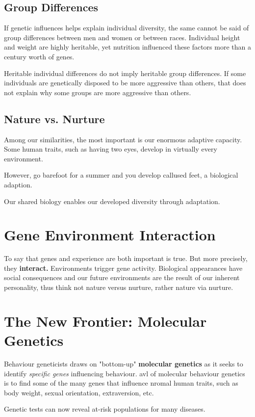 \subsection*{Group Differences}
If genetic influences helps explain individual diversity, the same cannot be said of group differences between men and women or between races. Individual height and weight are highly heritable, yet nutrition influenced these factors more than a century worth of genes.

Heritable individual differences do not imply heritable group differences. If some individuals are genetically disposed to be more aggressive than others, that does not explain why some groups are more aggressive than others. 

\subsection*{Nature vs. Nurture} 
Among our similarities, the most important is our enormous adaptive capacity. Some human traits, such as having two eyes, develop in virtually every environment.

However, go barefoot for a summer and you develop callused feet, a biological adaption. 

Our shared biology enables our developed diversity through adaptation.

\section*{Gene Environment Interaction}
To say that genes and experience are both important is true. But more precisely, they \textbf{interact.} Environments trigger gene activity. Biological appearances have social consequences and our future environments are the result of our inherent personality, thus think not nature versus nurture, rather nature via nurture.

\section*{The New Frontier: Molecular Genetics}
Behaviour geneticists draws on "bottom-up" \textbf{molecular genetics} as it seeks to identify \textit{specific genes} influencing behaviour.
avl of molecular behaviour genetics is to find some of the many genes that influence nromal human traits, such as body weight, sexual orientation, extraversion, etc.

Genetic tests can now reveal at-risk populations for many diseases.

